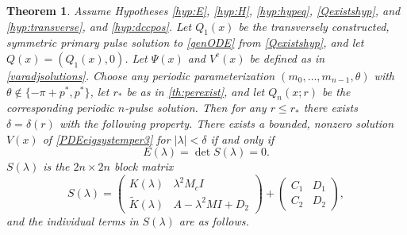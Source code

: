 \documentclass[10pt,reqno]{amsart}
\theoremstyle{plain}
\newtheorem{theorem}{Theorem}
\theoremstyle{definition}
\theoremstyle{remark}
\numberwithin{theorem}{section}
\numberwithin{equation}{section}
\begin{document}
\begin{theorem}\label{blockmatrixtheorem}
Assume Hypotheses \ref{hyp:E}, \ref{hyp:H}, \ref{hyp:hypeq}, \ref{Qexistshyp}, and \ref{hyp:transverse}, and \ref{hyp:dccpos}. Let $Q_1(x)$ be the transversely constructed, symmetric primary pulse solution to \eqref{genODE} from \cref{Qexistshyp}, and let $Q(x) = (Q_1(x), 0)$. Let $\Psi(x)$ and $V^c(x)$ be defined as in \cref{varadjsolutions}. Choose any periodic parameterization $(m_0, \dots, m_{n-1}, \theta)$ with $\theta \notin \{-\pi + p^*, p^* \}$, let $r_*$ be as in \cref{th:perexist}, and let $Q_n(x; r)$ be the corresponding periodic $n$-pulse solution. Then for any $r \leq r_*$ there exists $\delta = \delta(r)$ with the following property. There exists a bounded, nonzero solution $V(x)$ of \cref{PDEeigsystemper3} for $|\lambda| < \delta$ if and only if
\begin{equation}\label{blockmatrixcond}
E(\lambda) = \det S(\lambda) = 0.
\end{equation}
$S(\lambda)$ is the $2n \times 2n$ block matrix
\begin{equation}\label{blockeq}
S(\lambda) = 
\begin{pmatrix}
K(\lambda) & \lambda^2 M_c I \\
\tilde{K}(\lambda) & A - \lambda^2 MI + D_2
\end{pmatrix} +
\begin{pmatrix}C_1 & D_1 \\ C_2 & D_2
\end{pmatrix},
\end{equation}
and the individual terms in $S(\lambda)$ are as follows.


\end{theorem}
\end{document}
